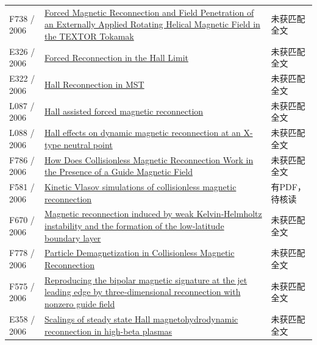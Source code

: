 \documentclass[UTF8,a4paper,11pt,openany,fontset=fandol]{ctexbook}
\begin{document}
\begin{longtable}{P{24mm}P{97mm}P{27mm}}
F738 / 2006 & \href{https://doi.org/10.1103/physrevlett.97.085003}{Forced Magnetic Reconnection and Field Penetration of an Externally Applied Rotating Helical Magnetic Field in the TEXTOR Tokamak} & 未获匹配全文\\

E326 / 2006 & \href{http://ui.adsabs.harvard.edu/abs/2006AGUFMSM41A1443H/abstract}{Forced Reconnection in the Hall Limit} & 未获匹配全文\\

E322 / 2006 & \href{http://absimage.aps.org/image/DPP06/MWS_DPP06-2006-001101.pdf}{Hall Reconnection in MST} & 未获匹配全文\\

L087 / 2006 & \href{https://doi.org/10.1063/1.2398933}{Hall assisted forced magnetic reconnection} & 未获匹配全文\\

L088 / 2006 & \href{https://doi.org/10.1051/0004-6361:20054391}{Hall effects on dynamic magnetic reconnection at an X-type neutral point} & 未获匹配全文\\

F786 / 2006 & \href{http://absimage.aps.org/image/DPP05/MWS_DPP05-2005-020014.pdf}{How Does Collisionless Magnetic Reconnection Work in the Presence of a Guide Magnetic Field} & 未获匹配全文\\

F581 / 2006 & \href{https://doi.org/10.1063/1.2347101}{Kinetic Vlasov simulations of collisionless magnetic reconnection} & 有PDF，待核读\\

F670 / 2006 & \href{https://doi.org/10.1029/2006gl026318}{Magnetic reconnection induced by weak Kelvin‐Helmholtz instability and the formation of the low‐latitude boundary layer} & 未获匹配全文\\

F778 / 2006 & \href{https://ntrs.nasa.gov/search.jsp?R=20060013113}{Particle Demagnetization in Collisionless Magnetic Reconnection} & 未获匹配全文\\

F575 / 2006 & \href{https://doi.org/10.1029/2005ja011521}{Reproducing the bipolar magnetic signature at the jet leading edge by three‐dimensional reconnection with nonzero guide field} & 未获匹配全文\\

E358 / 2006 & \href{https://doi.org/10.1063/1.2218815}{Scalings of steady state Hall magnetohydrodynamic reconnection in high-beta plasmas} & 未获匹配全文\\


\end{longtable}
\end{document}
